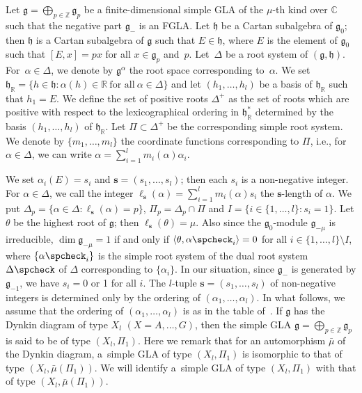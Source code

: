 \documentclass[pdftex]{sigma}
\numberwithin{equation}{section}
\numberwithin{theorem}{section}
\numberwithin{proposition}{section}
\numberwithin{lemma}{section}
\numberwithin{corollary}{section}
\numberwithin{definition}{section}
\numberwithin{example}{section}
\numberwithin{remark}{section}
\numberwithin{note}{section}
\newcommand{\gla}[1]{\mathfrak#1=\bigoplus\limits_{p\in\mathbb Z}\mathfrak#1_p} \renewcommand{\labelenumi}{{\rm (\arabic{enumi})}}
\begin{document}
Let $\gla g$ be a f\/inite-dimensional simple GLA of the $\mu$-th kind over
$\mathbb C$ such that the negative part $\mathfrak g_-$ is an FGLA.
Let $\mathfrak h$ be a Cartan subalgebra of $\mathfrak g_0$;
then $\mathfrak h$ is a Cartan subalgebra of $\mathfrak g$ such that
$E\in \mathfrak h$, where
$E$ is  the element of $\mathfrak g_0$ such that
$[E,x]=px$ for all $x\in\mathfrak g_p$ and~$p$.
Let~$\Delta$ be
a root system of $(\mathfrak g,\mathfrak h)$. For~$\alpha\in\Delta$,
we denote by $\mathfrak g^{\alpha}$ the root space corresponding to~$\alpha$. We set
$\mathfrak h_\mathbb R=\{ h\in\mathfrak h:\alpha(h)\in\mathbb R\ \text{for all}\ \alpha\in \Delta \}$
and let $(h_1,\dots,h_l)$ be a basis of $\mathfrak h_\mathbb R$ such that
$h_1=E$.
We def\/ine the set of positive roots $\Delta^+$ as the set of roots
which are positive with respect to the lexicographical ordering
in $\mathfrak h_{\mathbb R}^*$ determined by the basis $(h_1,\dots,h_l)$ of
$\mathfrak h_{\mathbb R}$.
Let $\Pi\subset \Delta^+$ be the corresponding simple root system.
We denote by $\{m_1,\dots,m_l\}$ the coordinate functions
corresponding to $\Pi$, i.e., for $\alpha\in\Delta$,
we can write $\alpha=\sum\limits_{i=1}^l m_i(\alpha)\alpha_i$.

We set $\alpha_i(E)=s_i$ and $\bm s=(s_1,\dots,s_l)$;
then each $s_i$ is a non-negative integer.
For $\alpha\in\Delta$, we call the integer
$\ell_{\bm s}(\alpha)=\sum\limits_{i=1}^l m_i(\alpha)s_i$ the
$\bm s$-length of $\alpha$.
We put $\Delta_p=\{ \alpha\in\Delta: \ell_{\bm s}(\alpha)=p \}$,
$\Pi_p=\Delta_p\cap \Pi$ and $I=\{ i\in\{1,\dots,l\}: s_i=1 \}$.
Let $\theta$ be the highest root of $\mathfrak g$; then
$\ell_{\bm s}(\theta)=\mu$. Also since the $\mathfrak g_0$-module
$\mathfrak g_{-\mu}$ is irreducible,
$\dim \mathfrak g_{-\mu}=1$
if and only if $\langle \theta,\alpha\spcheck_i\rangle=0$ for all
$i\in\{1,\dots,l\}\setminus I$, where $\{\alpha\spcheck_i\}$ is the simple root system of the dual root system $\Delta\spcheck$ of $\Delta$ corresponding
to $\{\alpha_i\}$.
In our situation, since $\mathfrak g_-$ is generated by
$\mathfrak g_{-1}$, we have $s_i=0$ or 1 for all $i$.
The $l$-tuple $\bm s=(s_1,\dots,s_l)$ of non-negative integers
is determined only by the ordering of $(\alpha_1,\dots,\alpha_l)$.
In what follows, we assume that the ordering of
$(\alpha_1,\dots,\alpha_l)$ is as in the table of~\cite{bou68:1}.
If $\mathfrak g$ has the Dynkin diagram of type $X_l$ $(X=A,\dots,G)$,
then the simple GLA $\gla g$
is said to be of type $(X_l,\Pi_1)$.
Here we remark that for an automorphism $\bar{\mu}$ of the
Dynkin diagram, a~simple GLA of type $(X_l,\Pi_1)$
is isomorphic to that of type $(X_l,\bar{\mu}(\Pi_1))$.
We will identify a~simple GLA of type $(X_l,\Pi_1)$
with that of type $(X_l,\bar{\mu}(\Pi_1))$.
\end{document}
